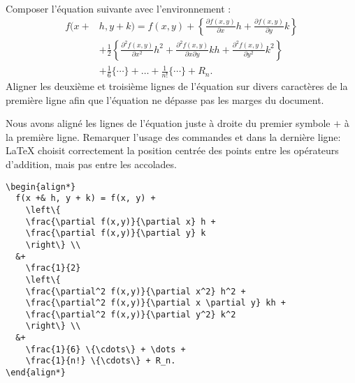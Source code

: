 \begin{exercice}
  Composer l'équation suivante avec l'environnement :
  \begin{align*}
    f(x +& h, y + k)
    = f(x, y) +
      \left\{
      \frac{\partial f(x, y)}{\partial x} h +
      \frac{\partial f(x, y)}{\partial y} k
      \right\} \\
    &+
      \frac{1}{2}
      \left\{
      \frac{\partial^2 f(x, y)}{\partial x^2} h^2 +
      \frac{\partial^2 f(x, y)}{\partial x \partial y} kh +
      \frac{\partial^2 f(x, y)}{\partial y^2} k^2
      \right\} \\
    &+
      \frac{1}{6} \{\cdots\} + \dots + \frac{1}{n!} \{\cdots\} + R_n.
  \end{align*}
  Aligner les deuxième et troisième lignes de l'équation sur divers
  caractères de la première ligne afin que l'équation ne dépasse pas
  les marges du document.
  \begin{sol}
    Nous avons aligné les lignes de l'équation juste à droite du
    premier symbole $+$ à la première ligne. Remarquer l'usage des
    commandes \cmd{\cdots} et \cmd{\dots} dans la dernière ligne:
    {\LaTeX} choisit correctement la position centrée des points entre les
    opérateurs d'addition, mais pas entre les accolades.
\begin{lstlisting}
\begin{align*}
  f(x +& h, y + k) = f(x, y) +
    \left\{
    \frac{\partial f(x,y)}{\partial x} h +
    \frac{\partial f(x,y)}{\partial y} k
    \right\} \\
  &+
    \frac{1}{2}
    \left\{
    \frac{\partial^2 f(x,y)}{\partial x^2} h^2 +
    \frac{\partial^2 f(x,y)}{\partial x \partial y} kh +
    \frac{\partial^2 f(x,y)}{\partial y^2} k^2
    \right\} \\
  &+
    \frac{1}{6} \{\cdots\} + \dots +
    \frac{1}{n!} \{\cdots\} + R_n.
\end{align*}
\end{lstlisting}
  \end{sol}
\end{exercice}

